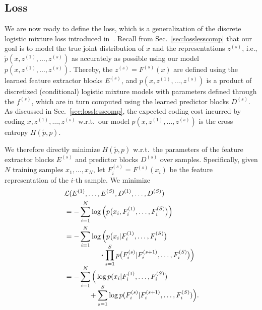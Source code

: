 \documentclass[10pt,twocolumn,letterpaper]{article}
\newcommand{\lossidx}{i}
\newcommand{\lossparts}[1]{F^{(#1)}_\lossidx}
\begin{document}
\subsection{Loss}

We are now ready to define the loss, which is a generalization of the discrete logistic mixture loss introduced in~\cite{Salimans2017pcnnpp}. Recall from Sec.~\ref{sec:losslesscomp} that our goal is to model the true joint distribution of $x$ and the representations $z^{(s)}$, i.e., $\tilde p(x, z^{(1)},\ldots,z^{(s)})$ as accurately as possible using our model $p(x, z^{(1)},\ldots,z^{(s)})$. Thereby, the $z^{(s)}=F^{(s)}(x)$ are defined using the learned feature extractor blocks $E^{(s)}$, and $p(x, z^{(1)},\ldots,z^{(s)})$ is a product of discretized (conditional) logistic mixture models with parameters defined through the $f^{(s)}$, which are in turn computed using the learned predictor blocks $D^{(s)}$. As discussed in Sec.~\ref{sec:losslesscomp}, the expected coding cost incurred by coding $x, z^{(1)},\ldots,z^{(s)}$ w.r.t.\ our model $p(x, z^{(1)},\ldots,z^{(s)})$ is the cross entropy $H(\tilde p,p)$.

We therefore directly minimize $H(\tilde p,p)$ w.r.t.\ the parameters of the feature extractor blocks $E^{(s)}$ and predictor blocks $D^{(s)}$ over samples. Specifically, given $N$ training samples $x_1, \dots, x_N$, let $\lossparts{s} = F^{(s)}(x_\lossidx)$ be the feature representation of the $i$-th sample.
We minimize
\begin{align}
    &\mathcal L(E^{(1)}, \ldots, E^{(S)}, D^{(1)}, \ldots, D^{(S)}) \nonumber\\
    &=-\sum_{\lossidx=1}^N \log 
        \Big(
            p\big(x_\lossidx, \lossparts{1}, \ldots, \lossparts{S}\big)
        \Big) \nonumber\\
    &=-\sum_{\lossidx=1}^N \log 
        \Big(
            p\big(x_\lossidx|\lossparts{1}, \ldots, \lossparts{S}\big) \nonumber\\[-2ex]
    &\hspace{5em} 
                  \boldsymbol{\cdot} \prod_{s=1}^{S} p
                              \big(\lossparts{s}|\lossparts{s+1}, \ldots, \lossparts{S}\big) 
        \Big) \nonumber\\[-1ex]
     &=-\sum_{\lossidx=1}^N \Big(\log p(x_\lossidx|\lossparts{1}, \ldots, \lossparts{S}) \nonumber\\[-2ex]
     & \hspace{3.5em}+ \sum_{s=1}^{S}\log p(\lossparts{s}|\lossparts{s+1}, \ldots, \lossparts{S})\Big)\label{eq:coding_cost}.
\end{align}
\end{document}
